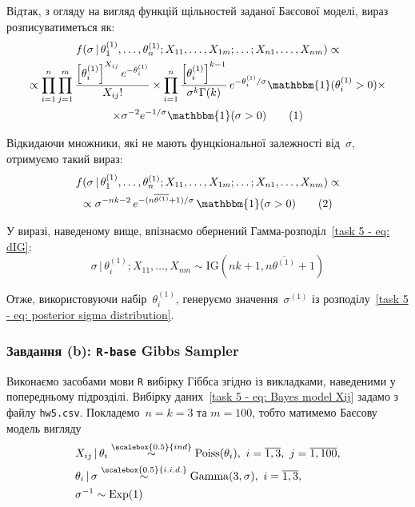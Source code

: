 \begin{enumerate}
        Відтак, з огляду на вигляд функцій щільностей заданої Баєсової моделі, вираз розписуватиметься як:
        \begin{multline*}
            f(\sigma \,|\, \theta_1^{(1)},\ldots,\theta_n^{(1)}; X_{11},\ldots,X_{1m};\ldots;X_{n1},\ldots,X_{nm}) \propto \\
            \propto \prod_{i=1}^{n} \prod_{j=1}^{m} \frac{\left[ \theta_i^{(1)} \right]^{X_{ij}} e^{-\theta_i^{(1)}}}{X_{ij}!} \times \prod_{i=1}^{n} \frac{\left[ \theta_i^{(1)} \right]^{k-1}}{\sigma^{k}\Gamma(k)}\, e^{-\theta_i^{(1)}/\sigma} \mathbbm{1}(\theta_i^{(1)}>0) \times \\ 
            \times \sigma^{-2}e^{-1/\sigma} \mathbbm{1}(\sigma>0) \stepcounter{equation}\tag{\theequation}
        \end{multline*}
       
        Відкидаючи множники, які не мають фунцкіональної залежності від~$\sigma$, отримуємо такий вираз:
        \begin{multline*}
            f(\sigma \,|\, \theta_1^{(1)},\ldots,\theta_n^{(1)}; X_{11},\ldots,X_{1m};\ldots;X_{n1},\ldots,X_{nm}) \propto \\
            \propto \sigma^{-nk-2}\, e^{-(n\overline{\theta^{(1)}} + 1)/\sigma}\, \mathbbm{1}(\sigma>0) \stepcounter{equation}\tag{\theequation}
        \end{multline*}

        У виразі, наведеному вище, впізнаємо обернений Гамма-розподіл~\eqref{task 5 - eq: dIG}:
        \begin{equation}\label{task 5 - eq: posterior sigma distribution}
            \sigma \,|\, \theta_i^{(1)}; X_{11},\ldots,X_{nm} \sim \mathrm{IG}\left( nk+1, n\overline{\theta^{(1)}} + 1 \right)
        \end{equation}

        Отже, використовуючи набір~$\theta_i^{(1)}$, генеруємо значення~$\sigma^{(1)}$ із розподілу~\eqref{task 5 - eq: posterior sigma distribution}.
\end{enumerate}

\subsubsection*{Завдання (b): \texttt{R-base} Gibbs Sampler}

Виконаємо засобами мови \texttt{R} вибірку Гіббса згідно із викладками, наведеними у попередньому підрозділі. Вибірку даних~\eqref{task 5 - eq: Bayes model Xij} задамо з файлу \texttt{hw5.csv}. Покладемо~$n=k=3$ та $m=100$, тобто матимемо Баєсову модель вигляду
\begin{align}
    & X_{ij} \,|\, \theta_i \overset{\scalebox{0.5}{ind}}{\sim} \mathrm{Poiss}(\theta_i),\ i=\overline{1,3},\ j=\overline{1,100}, \\
    & \theta_i \,|\, \sigma \overset{\scalebox{0.5}{i.i.d.}}{\sim} \mathrm{Gamma}(3,\sigma),\ i=\overline{1,3}, \\
    & \sigma^{-1} \sim \mathrm{Exp}(1)
\end{align}

